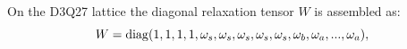 On the D3Q27 lattice the diagonal relaxation tensor $W$ is assembled as:
\begin{equation}
    W={\rm diag}(1,1,1,1,\omega_{s},\omega_{s},\omega_{s},\omega_{s},\omega_{s},\omega_{b},\omega_{a},...,\omega_{a}),
\end{equation}
